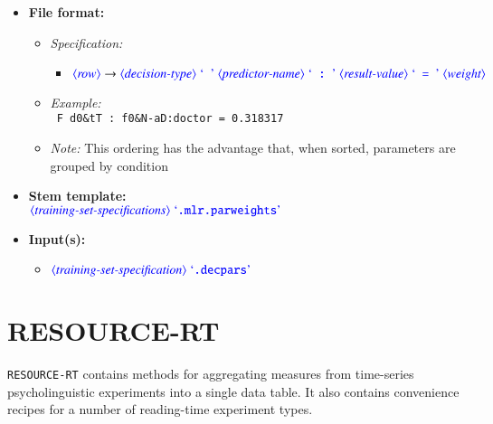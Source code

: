 \documentclass[12pt]{report}
\def\magenta{\color{magenta}}
\begin{document}
\begin{itemize}
      \item \textbf{File format:}
      \begin{itemize}
            \item \textit{Specification:}
            \begin{itemize}
                  \item {\small $\dtype{row} \rightarrow \dtype{decision-type} \ \dcode{\ } \ \dtype{predictor-name} \ \dcode{\ :\ } \ \dtype{result-value} \ \dcode{\ =\ } \ \dtype{weight}$}
            \end{itemize}
            \item \textit{Example:}\\
            {\magenta\tt
            F d0\&tT : f0\&N-aD:doctor = 0.318317
            }
            \item \textit{Note:} This ordering has the advantage that, when sorted, parameters are grouped by condition
      \end{itemize}
      \item \textbf{Stem template:}\\
      $\dtype{training-set-specifications}  \ \dcode{.mlr.parweights}$
      \item \textbf{Input(s):}
      \begin{itemize}
            \item $\dtype{training-set-specification} \ \dcode{.decpars}$
      \end{itemize}
\end{itemize}







\chapter{RESOURCE-RT}

{\tt RESOURCE-RT} contains methods for aggregating measures from time-series psycholinguistic experiments into a single data table. It also contains convenience recipes for a number of reading-time experiment types.
\end{document}

